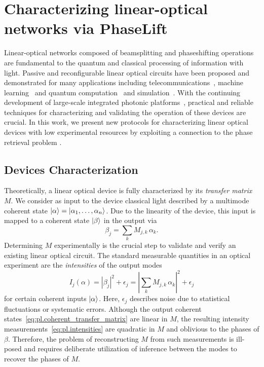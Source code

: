 \chapter{Characterizing linear-optical networks via PhaseLift}%
\label{chap:phaselift}



Linear-optical networks composed of beamsplitting and phaseshifting operations are fundamental to the quantum and classical processing of information with light.
Passive and reconfigurable linear optical circuits have been proposed and demonstrated for many applications including telecommunications~\cite{Miller_2015_Sorting}, machine learning~\cite{Shen_2017_Deep} and quantum computation~\cite{Carolan_2015_Universal} and simulation~\cite{Harris_2017_Quantum}.
With the continuing development of large-scale integrated photonic platforms~\cite{Silverstone_2016_Silicon,Seok_2016_LargeScale}, practical and reliable techniques for characterizing and validating the operation of these devices are crucial.
In this work, we present new protocols for characterizing linear optical devices with low experimental resources by exploiting a connection to the phase retrieval problem \cite{Walther_1963_Question}.


\section{Devices Characterization}%
\label{sec:pl.optics}


Theoretically, a linear optical device is fully characterized by its \emph{transfer matrix} ${M}$.
We consider as input to the device classical light described by a multimode coherent state $\ket{{\alpha}} = \ket{\alpha_1, \ldots, \alpha_n}$.
Due to the linearity of the device, this input is mapped to a coherent state $\ket{{\beta}}$ in the output via
\[
  \beta_j = \sum_k M_{j,k} \,\alpha_k.
  \label{eq:pl.coherent_transfer_matrix}
\]
Determining ${M}$ experimentally is the crucial step to validate and verify an existing linear optical circuit.
The standard measurable quantities in an optical experiment are the \emph{intensities} of the output modes
\[
  I_j({\alpha})
  = \left| \beta_j \right|^2 + \epsilon_j
  = \left| \sum_k M_{j,k} \, \alpha_k \right|^2 + \epsilon_j
  \label{eq:pl.intensities}
\]
for certain coherent inputs $\ket{{\alpha}}$.
Here, $\epsilon_j$ describes noise due to statistical fluctuations or systematic errors.
Although the output coherent states~\eqref{eq:pl.coherent_transfer_matrix} are linear in ${M}$, the resulting intensity measurements~\eqref{eq:pl.intensities} are quadratic in ${M}$ and oblivious to the phases of $\beta$.
Therefore, the problem of reconstructing ${M}$ from such measurements is ill-posed and requires deliberate utilization of inference between the modes to recover the phases of $M$.

